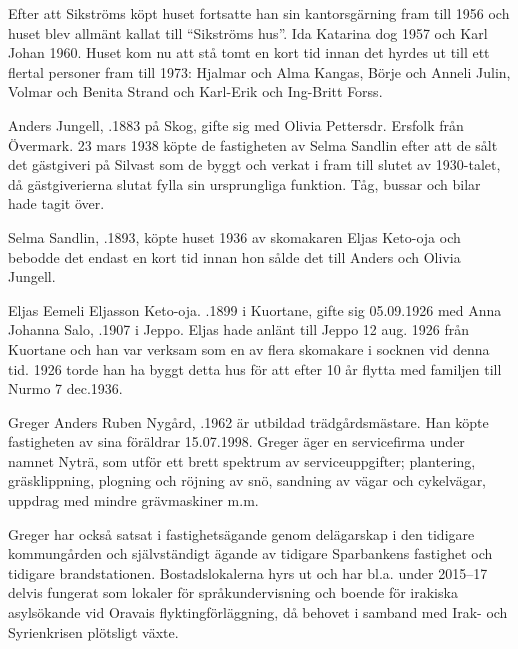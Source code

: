 {{{{Efter att Sikströms köpt huset fortsatte han sin kantorsgärning fram till 1956 och huset blev allmänt kallat till ``Sikströms hus''. Ida Katarina dog 1957 och Karl Johan 1960. Huset kom nu att stå tomt en kort tid innan det hyrdes ut till ett flertal personer fram till 1973:
Hjalmar och Alma Kangas, Börje och Anneli Julin, Volmar och Benita Strand och Karl-Erik och Ing-Britt Forss.


Anders Jungell, .1883 på Skog, gifte sig med Olivia Pettersdr. Ersfolk från Övermark. 23 mars 1938 köpte de fastigheten av Selma Sandlin efter att de sålt det gästgiveri på Silvast som de byggt och verkat i fram till slutet av 1930-talet, då gästgiverierna slutat fylla sin ursprungliga funktion. Tåg, bussar och bilar hade tagit över.


Selma Sandlin, .1893, köpte huset 1936 av skomakaren Eljas Keto-oja och bebodde det endast en kort tid innan hon sålde det till Anders och Olivia Jungell.


Eljas Eemeli Eljasson Keto-oja. .1899 i Kuortane, gifte sig 05.09.1926 med Anna Johanna Salo, .1907 i Jeppo. Eljas hade anlänt till Jeppo 12 aug. 1926 från Kuortane och han var verksam som en av flera skomakare i socknen vid denna tid. 1926 torde han ha byggt detta hus för att efter 10 år flytta med familjen till Nurmo 7 dec.1936.
\begin{jhchildren}
  \item {}
  \item {}
\end{jhchildren}






Greger Anders Ruben Nygård, .1962 är utbildad trädgårdsmästare. Han köpte fastigheten av sina föräldrar 15.07.1998. Greger äger en servicefirma under namnet Nyträ, som utför ett brett spektrum av serviceuppgifter; plantering, gräsklippning, plogning och röjning av snö, sandning av vägar och cykelvägar, uppdrag med mindre grävmaskiner m.m.

Greger har också satsat i fastighetsägande genom delägarskap i den tidigare kommungården och självständigt ägande av tidigare Sparbankens fastighet och tidigare brandstationen. Bostadslokalerna hyrs ut och har bl.a. under 2015--17 delvis fungerat som lokaler för språkundervisning och boende för irakiska asylsökande vid Oravais flyktingförläggning, då behovet i samband med Irak- och Syrienkrisen plötsligt växte.


}}}}
